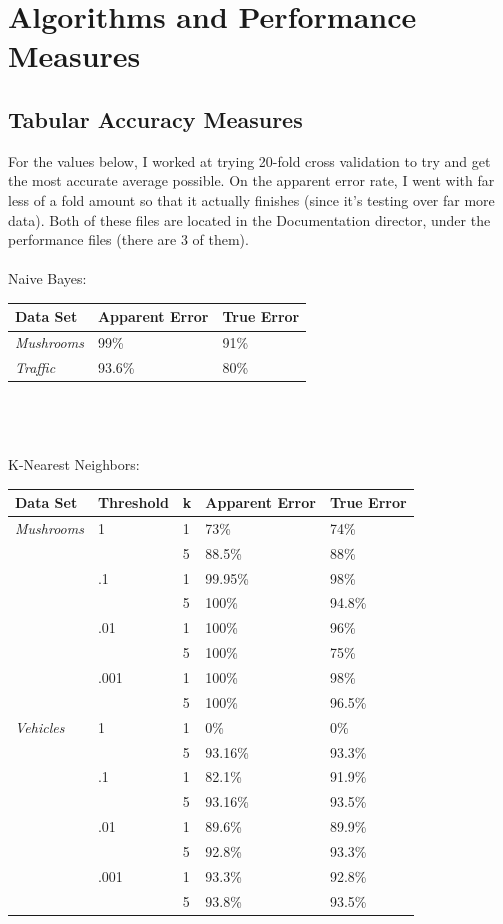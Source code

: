 \documentclass{article}
\begin{document}
\section{Algorithms and Performance Measures}
\subsection{Tabular Accuracy Measures}
For the values below, I worked at trying 20-fold cross validation to try and get the most accurate average possible.  On the apparent error rate, I went with far less of a fold amount so that it actually finishes (since it's testing over far more data).  Both of these files are located in the Documentation director, under the performance files (there are 3 of them).
\\ \\
Naive Bayes:\\
\begin{tabular}{ | l | l | l |}
  \hline
  \textbf{Data Set} & \textbf{Apparent Error} & \textbf{True Error} \\ \hline
  \textit{Mushrooms} & 99\% & 91\% \\ \hline
  \textit{Traffic} & 93.6\% & 80\% \\ \hline
\end{tabular}
\\ \\ \\
K-Nearest Neighbors:\\
\begin{tabular}{ | l | l | l | l | l | }
  \hline			
  \textbf{Data Set} & Threshold & k & \textbf{Apparent Error} & \textbf{True Error} \\ \hline
  \textit{Mushrooms} & 1 & 1 & 73\% & 74\% \\
  & & 5 & 88.5\% & 88\% \\
  & .1 & 1 & 99.95\% & 98\% \\
  & & 5 & 100\% & 94.8\% \\
  & .01 & 1 & 100\% & 96\% \\
  & & 5 & 100\% & 75\% \\
  & .001 & 1 & 100\% & 98\% \\
  & & 5 & 100\% & 96.5\% \\ \hline
  \textit{Vehicles} & 1 & 1 & 0\% & 0\% \\
  & & 5 & 93.16\% & 93.3\% \\
  & .1 & 1 & 82.1\% & 91.9\% \\
  & & 5 & 93.16\% & 93.5\% \\
  & .01 & 1 & 89.6\% & 89.9\% \\
  & & 5 & 92.8\% & 93.3\% \\
  & .001 & 1 & 93.3\% & 92.8\% \\
  & & 5 & 93.8\% & 93.5\% \\ \hline
\end{tabular}
\end{document}
